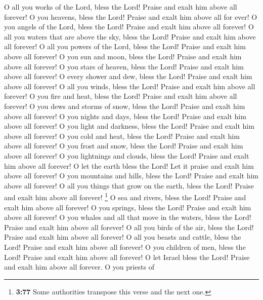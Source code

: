  O all you works of the Lord, bless the Lord! Praise and
exalt him above all forever!  O you heavens, bless the
Lord! Praise and exalt him above all for ever!  O you
angels of the Lord, bless the Lord! Praise and exalt him above all
forever!  O all you waters that are above the sky, bless
the Lord! Praise and exalt him above all forever!  O all
you powers of the Lord, bless the Lord! Praise and exalt him above all
forever!  O you sun and moon, bless the Lord! Praise and
exalt him above all forever!  O you stars of heaven,
bless the Lord! Praise and exalt him above all forever! 
O every shower and dew, bless the Lord! Praise and exalt him above all
forever!  O all you winds, bless the Lord! Praise and
exalt him above all forever!  O you fire and heat, bless
the Lord! Praise and exalt him above all forever!  O you
dews and storms of snow, bless the Lord! Praise and exalt him above all
forever!  O you nights and days, bless the Lord! Praise
and exalt him above all forever!  O you light and
darkness, bless the Lord! Praise and exalt him above all forever!
 O you cold and heat, bless the Lord! Praise and exalt
him above all forever!  O you frost and snow, bless the
Lord! Praise and exalt him above all forever!  O you
lightnings and clouds, bless the Lord! Praise and exalt him above all
forever!  O let the earth bless the Lord! Let it praise
and exalt him above all forever!  O you mountains and
hills, bless the Lord! Praise and exalt him above all forever!
 O all you things that grow on the earth, bless the Lord!
Praise and exalt him above all forever!  \footnote{\textbf{3:77}
  Some authorities transpose this verse and the next one.} O sea and
rivers, bless the Lord! Praise and exalt him above all forever!
 O you springs, bless the Lord! Praise and exalt him
above all forever!  O you whales and all that move in the
waters, bless the Lord! Praise and exalt him above all forever!
 O all you birds of the air, bless the Lord! Praise and
exalt him above all forever!  O all you beasts and
cattle, bless the Lord! Praise and exalt him above all forever!
 O you children of men, bless the Lord! Praise and exalt
him above all forever!  O let Israel bless the Lord!
Praise and exalt him above all forever.  O you priests of
